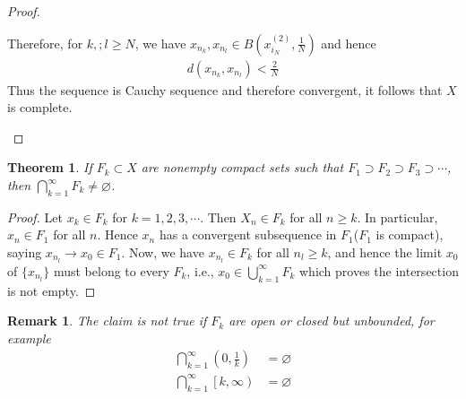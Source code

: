 \documentclass[12pt,leqno]{amsart}
\newtheorem{theorem}{Theorem}[section]
\newtheorem{remark}{Remark}[section]
\theoremstyle{definition}
\numberwithin{equation}{subsection}
\begin{document}
\begin{proof}
\begin{enumerate}
    Therefore, for $k,;l\geq N$, we have $x_{n_k},x_{n_l}\in B\left(x_{i_N}^{(2)},\frac{1}{N}\right)$ and hence
    \begin{align*}
        d(x_{n_k},x_{n_l}) < \frac{2}{N}
    \end{align*}
    Thus the sequence is Cauchy sequence and therefore convergent, it follows that $X$ is complete.
\end{enumerate}

\end{proof}

\begin{theorem}
If $F_k\subset X$ are nonempty compact sets such that $F_1\supset F_2\supset F_3\supset\cdots$, then $\bigcap^\infty_{k=1}F_k\neq\varnothing$.
\end{theorem}
\begin{proof}
Let $x_k\in F_k$ for $k = 1,2,3,\cdots$. Then $X_n\in F_k$ for all $n\geq k$. In particular, $x_n\in F_1$ for all $n$. Hence $x_n$ has a convergent subsequence  in $F_1$($F_1$ is compact), saying $x_{n_l}\to x_0\in F_1$. Now, we have $x_{n_l}\in F_k$ for all $n_l \geq k$, and hence the limit $x_0$ of $\{x_{n_l}\}$ must belong to every $F_k$, i.e., $x_0\in \bigcup^\infty_{k=1}F_k$ which proves the intersection is not empty.
\end{proof}
\begin{remark}
The claim is not true if $F_k$ are open or closed but unbounded, for example
\begin{align*}
    \bigcap^\infty_{k=1}\left(0,\frac{1}{k}\right) &= \varnothing \\
    \bigcap^\infty_{k=1}\left[k,\infty\right) &= \varnothing
\end{align*}
\end{remark}

\medskip
\end{document}
